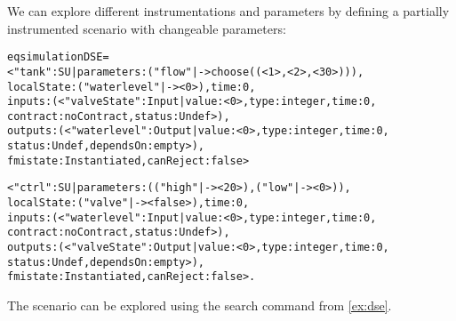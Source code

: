 \begin{example}
  We can explore different instrumentations and parameters by defining a partially instrumented scenario with changeable parameters:
\scriptsize
\begin{alltt}
eq simulationDSE =  
< "tank" : SU | parameters : ("flow" |-> choose((< 1 >,< 2 >,< 30 >))), 
localState : ( "waterlevel" |-> < 0 > ) , time : 0, 
inputs : (< "valveState" : Input | value : < 0 >, type : integer, time : 0, 
                                   contract : noContract, status : Undef  >), 
outputs : (< "waterlevel" : Output | value : < 0 >, type : integer, time : 0, 
                                     status : Undef, dependsOn : empty >), 
fmistate : Instantiated, canReject : false >

< "ctrl" : SU | parameters : (("high" |-> < 20 >) , ("low" |-> < 0 >)), 
localState : ( "valve" |-> < false >), time : 0, 
inputs : (< "waterlevel" : Input | value : < 0 >, type : integer, time : 0, 
                                   contract : noContract, status : Undef  >), 
outputs : (< "valveState" : Output | value : < 0 >, type : integer, time : 0, 
                                     status : Undef, dependsOn : empty >), 
fmistate : Instantiated, canReject : false > .
\end{alltt}
\normalsize
The scenario can be explored using the search command from \cref{ex:dse}. 
\end{example}



